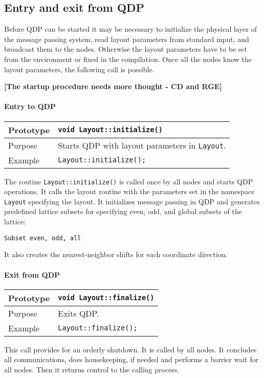 \documentclass[12pt,letterpaper]{article}
\begin{document}
\subsection{Entry and exit from QDP}

Before QDP can be started it may be necessary to initialize the
physical layer of the message passing system, read layout parameters
from standard input, and broadcast them to the nodes.  Otherwise the
layout parameters have to be set from the environment or fixed in the
compilation.  Once all the nodes know the layout parameters, the
following call is possible.

{\bf [The startup procedure needs more thought - CD and RGE]}

\paragraph{Entry to QDP}

\begin{flushleft}
  \begin{tabular}{|l|l|}
  \hline
  Prototype      & \verb|void Layout::initialize()|\\
    \hline
  Purpose        & Starts QDP with layout parameters in \verb|Layout|. \\
\hline
  Example  & \verb|Layout::initialize();| \\
   \hline
 \end{tabular}
\end{flushleft}
%
The routine \verb|Layout::initialize()| is called once by all nodes and
starts QDP operations.  It calls the layout routine with the
parameters set in the namespace \verb|Layout| specifying the layout. 
It initializes message
passing in QDP and generates predefined lattice subsets for specifying
even, odd, and global subsets of the lattice:

\begin{verbatim}
Subset even, odd, all
\end{verbatim}
%
It also creates the nearest-neighbor shifts for each coordinate
direction.

\paragraph{Exit from QDP}

\begin{flushleft}
  \begin{tabular}{|l|l|}
  \hline
  Prototype      & \verb|void Layout::finalize()|\\
    \hline
  Purpose        & Exits QDP. \\
\hline
  Example  & \verb|Layout::finalize();| \\
   \hline
 \end{tabular}
\end{flushleft}
%
This call provides for an orderly shutdown.  It is called by all
nodes. It concludes all communications, does housekeeping, if needed
and performs a barrier wait for all nodes.  Then it returns control to
the calling process.
\end{document}
